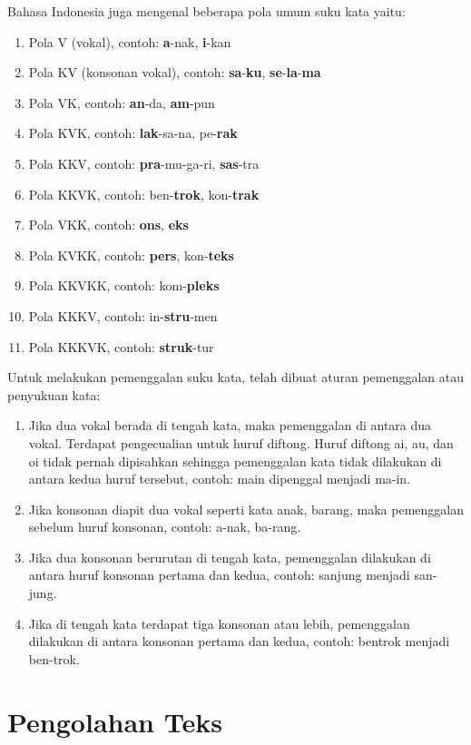 Bahasa Indonesia juga mengenal beberapa pola umum suku kata yaitu:

\begin{enumerate}
	\item Pola V (vokal), contoh: \textbf{a}-nak, \textbf{i}-kan
	\item Pola KV (konsonan vokal), contoh: \textbf{sa}-\textbf{ku}, \textbf{se}-\textbf{la}-\textbf{ma}
	\item Pola VK, contoh: \textbf{an}-da, \textbf{am}-pun
	\item Pola KVK, contoh: \textbf{lak}-sa-na, pe-\textbf{rak}
	\item Pola KKV, contoh: \textbf{pra}-mu-ga-ri, \textbf{sas}-tra
	\item Pola KKVK, contoh: ben-\textbf{trok}, kon-\textbf{trak}
	\item Pola VKK, contoh: \textbf{ons}, \textbf{eks}
	\item Pola KVKK, contoh: \textbf{pers}, kon-\textbf{teks}
	\item Pola KKVKK, contoh: kom-\textbf{pleks}
	\item Pola KKKV, contoh: in-\textbf{stru}-men
	\item Pola KKKVK, contoh: \textbf{struk}-tur
\end{enumerate}

Untuk melakukan pemenggalan suku kata, telah dibuat aturan pemenggalan atau penyukuan kata:

\begin{enumerate}
	\item Jika dua vokal berada di tengah kata, maka pemenggalan di antara dua vokal. Terdapat pengecualian untuk huruf diftong. Huruf diftong ai, au, dan oi tidak pernah dipisahkan sehingga pemenggalan kata tidak dilakukan di antara kedua huruf tersebut, contoh: main dipenggal menjadi ma-in.
	\item Jika konsonan diapit dua vokal seperti kata anak, barang, maka pemenggalan sebelum huruf konsonan, contoh: a-nak, ba-rang.
	\item Jika dua konsonan berurutan di tengah kata, pemenggalan dilakukan di antara huruf konsonan pertama dan kedua, contoh: sanjung menjadi san-jung.
	\item Jika di tengah kata terdapat tiga konsonan atau lebih, pemenggalan dilakukan di antara konsonan pertama dan kedua, contoh: bentrok menjadi ben-trok.
\end{enumerate}

\section{Pengolahan Teks}
\label{sec:pengolahan_teks}

